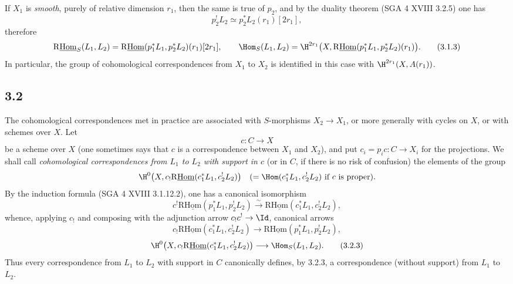 If $X_1$ is \emph{smooth}, purely of relative dimension $r_1$, then the same is true of $p_2$, and by the duality theorem (SGA 4 XVIII 3.2.5) one has
\[
p_2^!L_2\simeq p_2^*L_2(r_1)[2r_1],
\]
therefore
\begin{equation}
\mathrm{R}\underline{\mathrm{Hom}}_S(L_1,L_2)=\mathrm{R}\underline{\mathrm{Hom}}(p_1^*L_1,p_2^*L_2)(r_1)[2r_1],
\qquad
\Hom_S(L_1,L_2)=\H^{2r_1}\bigl(X,\mathrm{R}\underline{\mathrm{Hom}}(p_1^*L_1,p_2^*L_2)(r_1)\bigr).
\tag{3.1.3}
\end{equation}
In particular, the group of cohomological correspondences from $X_1$ to $X_2$ is identified in this case with $\H^{2r_1}(X,A(r_1))$.

\subsection*{3.2}
The cohomological correspondences met in practice are associated with $S$-morphisms $X_2\to X_1$, or more generally with cycles on $X$, or with schemes over $X$. Let
\[
c:C\longrightarrow X
\]
be a scheme over $X$ (one sometimes says that $c$ is a correspondence between $X_1$ and $X_2$), and put $c_i=p_ic:C\to X_i$ for the projections. We shall call \emph{cohomological correspondences from $L_1$ to $L_2$ with support in $c$} (or in $C$, if there is no risk of confusion) the elements of the group
\[
\H^0\bigl(X,c_!\mathrm{R}\underline{\mathrm{Hom}}(c_1^*L_1,c_2^!L_2)\bigr)
\quad(=\Hom(c_1^*L_1,c_2^!L_2)\text{ if }c\text{ is proper}).
\]
By the induction formula (SGA 4 XVIII 3.1.12.2), one has a canonical isomorphism
\begin{equation}
c^!\mathrm{R}\underline{\mathrm{Hom}}(p_1^*L_1,p_2^!L_2)
\xrightarrow{\sim}
\mathrm{R}\underline{\mathrm{Hom}}(c_1^*L_1,c_2^!L_2),
\tag{3.2.1}
\end{equation}
whence, applying $c_!$ and composing with the adjunction arrow $c_!c^!\to \Id$, canonical arrows
\begin{equation}
c_!\mathrm{R}\underline{\mathrm{Hom}}(c_1^*L_1,c_2^!L_2)
\longrightarrow
\mathrm{R}\underline{\mathrm{Hom}}(p_1^*L_1,p_2^!L_2),
\tag{3.2.2}
\end{equation}
\begin{equation}
\H^0\bigl(X,c_!\mathrm{R}\underline{\mathrm{Hom}}(c_1^*L_1,c_2^!L_2)\bigr)
\longrightarrow
\Hom_S(L_1,L_2).
\tag{3.2.3}
\end{equation}
Thus every correspondence from $L_1$ to $L_2$ with support in $C$ canonically defines, by 3.2.3, a correspondence (without support) from $L_1$ to $L_2$.


